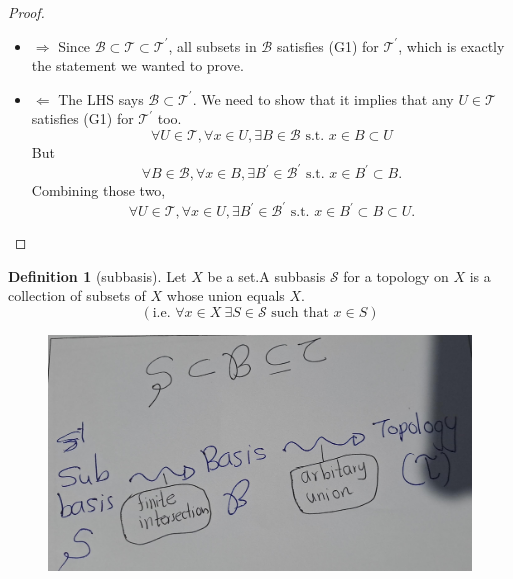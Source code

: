 \documentclass[
]{book}
\theoremstyle{definition}
\newtheorem{definition}{Definition}[chapter]
\theoremstyle{definition}
\theoremstyle{definition}
\theoremstyle{definition}
\theoremstyle{remark}
\begin{document}
\begin{proof}
\leavevmode

\begin{itemize}
\item
  \(\Rightarrow\) Since \(\mathcal{B} \subset \mathcal{T} \subset \mathcal{T}^{\prime}\), all subsets in \(\mathcal{B}\) satisfies (G1) for \(\mathcal{T}^{\prime}\), which is exactly the statement we wanted to prove.
\item
  \(\Leftarrow\) The LHS says \(\mathcal{B} \subset \mathcal{T}^{\prime}\). We need to show that it implies that any \(U \in \mathcal{T}\) satisfies (G1) for \(\mathcal{T}^{\prime}\) too.
  \[
  \forall U \in \mathcal{T}, \forall x \in U, \exists B \in \mathcal{B} \text { s.t. } x \in B \subset U
  \]But\[
  \forall B \in \mathcal{B}, \forall x \in B, \exists B^{\prime} \in \mathcal{B}^{\prime} \text { s.t. } x \in B^{\prime} \subset B .
  \]
  Combining those two,
  \[
  \forall U \in \mathcal{T}, \forall x \in U, \exists B^{\prime} \in \mathcal{B}^{\prime} \text { s.t. } x \in B^{\prime} \subset B \subset U .
  \]
\end{itemize}

\end{proof}

\begin{definition}[subbasis]
\protect\hypertarget{def:unnamed-chunk-18}{}\label{def:unnamed-chunk-18}Let \(X\) be a set.A subbasis \(\mathcal{S}\) for a topology on \(X\) is a collection of subsets of \(X\) whose union equals \(X\).
\[\left(\text{i.e. }\forall x\in X ~\exists S\in\mathcal{S} \text{  such that } x\in S\right)\]
\end{definition}

\begin{figure}
\centering
\includegraphics{figures/figure 06.jpg}
\caption{\label{fig:64}\(~\)}
\end{figure}
\end{document}

